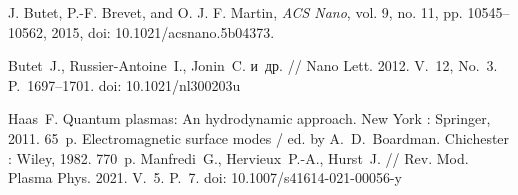 \documentclass[12pt, a4paper]{article}
\begin{document}
\begin{thebibliography}{99}
J. Butet, P.-F. Brevet, and O. J. F. Martin, \textit{ACS Nano}, vol. 9, no. 11, pp. 10545–10562, 2015, doi: 10.1021/acsnano.5b04373.

Butet~J., Russier-Antoine~I., Jonin~C. и~др. // Nano Lett. 2012. V.~12, No.~3. P.~1697--1701. doi: 10.1021/nl300203u



Haas~F. Quantum plasmas: An hydrodynamic approach. New York : Springer, 2011. 65~p.
Electromagnetic surface modes / ed. by A.~D.~Boardman. Chichester : Wiley, 1982. 770~p.
Manfredi~G., Hervieux~P.-A., Hurst~J. // Rev. Mod. Plasma Phys. 2021. V.~5. P.~7. 
doi: 10.1007/s41614-021-00056-y






\end{thebibliography}
\end{document}
